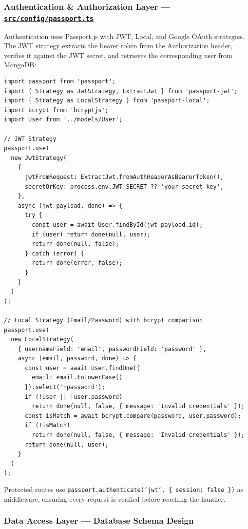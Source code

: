 \documentclass[12pt,letterpaper]{article}
\newcommand{\ghrepo}{https://github.com/omniV1/lunaraCare}
\begin{document}
\subsubsection{Authentication \& Authorization Layer --- \href{\ghrepo/blob/main/backend/src/config/passport.ts}{\texttt{src/config/passport.ts}}}

Authentication uses Passport.js with JWT, Local, and Google OAuth strategies. The JWT strategy extracts the bearer token from the Authorization header, verifies it against the JWT secret, and retrieves the corresponding user from MongoDB:

\begin{lstlisting}[caption={Passport.js authentication strategies (\texttt{passport.ts})}]
import passport from 'passport';
import { Strategy as JwtStrategy, ExtractJwt } from 'passport-jwt';
import { Strategy as LocalStrategy } from 'passport-local';
import bcrypt from 'bcryptjs';
import User from '../models/User';

// JWT Strategy
passport.use(
  new JwtStrategy(
    {
      jwtFromRequest: ExtractJwt.fromAuthHeaderAsBearerToken(),
      secretOrKey: process.env.JWT_SECRET ?? 'your-secret-key',
    },
    async (jwt_payload, done) => {
      try {
        const user = await User.findById(jwt_payload.id);
        if (user) return done(null, user);
        return done(null, false);
      } catch (error) {
        return done(error, false);
      }
    }
  )
);

// Local Strategy (Email/Password) with bcrypt comparison
passport.use(
  new LocalStrategy(
    { usernameField: 'email', passwordField: 'password' },
    async (email, password, done) => {
      const user = await User.findOne({
        email: email.toLowerCase()
      }).select('+password');
      if (!user || !user.password)
        return done(null, false, { message: 'Invalid credentials' });
      const isMatch = await bcrypt.compare(password, user.password);
      if (!isMatch)
        return done(null, false, { message: 'Invalid credentials' });
      return done(null, user);
    }
  )
);
\end{lstlisting}

Protected routes use \texttt{passport.authenticate('jwt', \{ session: false \})} as middleware, ensuring every request is verified before reaching the handler.

\subsubsection{Data Access Layer --- Database Schema Design}
\end{document}
